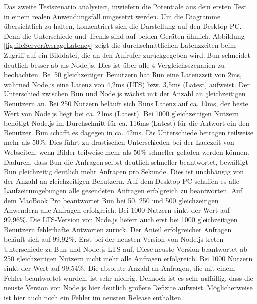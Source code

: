\noindent
Das zweite Testszenario analysiert, inwiefern die Potentiale aus dem ersten Test in einem realen Anwendungsfall umgesetzt werden. Um die Diagramme übersichtlich zu halten, konzentriert sich die Darstellung auf den Desktop-PC. Denn die Unterschiede und Trends sind auf beiden Geräten ähnlich. Abbildung \ref{fig:fileServerAverageLatency} zeigt die durchschnittlichen Latenzzeiten beim Zugriff auf ein Bilddatei, die an den Aufrufer zurückgegeben wird. Bun schneidet deutlich besser ab als Node.js. Dies ist über alle 4 Vergleichsszenarien zu beobachten. Bei 50 gleichzeitigen Benutzern hat Bun eine Latenzzeit von 2ms, währned Node.js eine Latenz von 4,2ms (LTS) bzw. 3,5ms (Latest) aufweist. Der Unterschied zwischen Bun und Node.js wächst mit der Anzahl an gleichzeitigen Benutzern an. Bei 250 Nutzern beläuft sich Buns Latenz auf ca. 10ms, der beste Wert von Node.js liegt bei ca. 21ms (Latest). Bei 1000 gleichzeitigen Nutzern benötigt Node.js im Durchschnitt für ca. 116ms (Latest) für die Antwort ein den Benutzer. Bun schafft es dagegen in ca. 42ms. Die Unterschiede betragen teilweise mehr als 50\%. Dies führt zu drastischen Unterschieden bei der Ladezeit von Webseiten, wenn Bilder teilweise mehr als 50\% schneller geladen werden können. Dadurch, dass Bun die Anfragen selbst deutlich schneller beantwortet, bewältigt Bun gleichzeitig deutlich mehr Anfragen pro Sekunde. Dies ist unabhängig von der Anzahl an gleichzeitigen Benutzern. Auf dem Desktop-PC schaffen es alle Laufzeitumgebungen alle gesendeten Anfragen erfolgreich zu beantworten. Auf dem MacBook Pro beantwortet Bun bei 50, 250 und 500 gleichzeitigen Anwendern alle Anfragen erfolgreich. Bei 1000 Nutzern sinkt der Wert auf 99,96\%. Die LTS-Version von Node.js liefert auch erst bei 1000 gleichzeitigen Benutzern fehlerhafte Antworten zurück. Der Anteil erfolgreicher Anfragen beläuft sich auf 99,92\%. Erst bei der neusten Version von Node.js treten Unterschiede zu Bun und Node.js LTS auf. Diese neuste Version beantwortet ab 250 gleichzeitigen Nutzern nicht mehr alle Anfragen erfolgreich. Bei 1000 Nutzern sinkt der Wert auf 99,54\%. Die absolute Anzahl an Anfragen, die mit einem Fehler beantwortet wurden, ist sehr niedrig. Dennoch ist es sehr auffällig, dass die neuste Version von Node.js hier deutlich größere Defizite aufweist. Möglicherweise ist hier auch noch ein Fehler im neusten Release enthalten.\\


